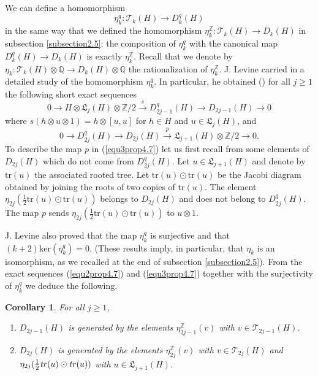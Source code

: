 \documentclass[10pt]{amsart}
\numberwithin{equation}{section}
\numberwithin{equation}{section}
\newtheorem{corollary}[theorem]{Corollary}
\theoremstyle{definition}
\begin{document}
We can define a homomorphism
\begin{equation}\label{equ1prop4.7}
\eta^q_k:\mathcal{T}_k(H)\longrightarrow D_k^q(H) 
\end{equation}
in the same way that we defined the homomorphism $\eta^{\mathbb{Z}}_k:\mathcal{T}_k(H)\rightarrow D_k(H)$ in subsection \ref{subsection2.5}:  the composition of $\eta^q_k$ with the canonical map $D^q_k(H)\rightarrow D_k(H)$ is exactly $\eta^{\mathbb{Z}}_k$. Recall that we denote by $\eta_k:\mathcal{T}_k(H)\otimes\mathbb{Q}\rightarrow D_k(H)\otimes\mathbb{Q}$ the rationalization of $\eta^{\mathbb{Z}}_k$.  J. Levine carried in \cite{MR2240921} a detailed study of the homomorphism $\eta^q_k$. In particular, he obtained (\cite[Corollary 2.3]{MR2240921}) for  all $j\geq 1$ the following short exact sequences
\begin{equation}\label{equ2prop4.7}
0\longrightarrow H\otimes\mathfrak{L}_j(H)\otimes \mathbb{Z}/2\stackrel{s}{\longrightarrow} D^q_{2j-1}(H)\longrightarrow D_{2j-1}(H)\longrightarrow 0
\end{equation}
where $s(h\otimes u\otimes 1)=h\otimes [u,u]$ for $h\in H$ and $u\in \mathfrak{L}_j(H)$, and
\begin{equation}\label{equ3prop4.7}
0\longrightarrow D^q_{2j}(H)\longrightarrow D_{2j}(H)\stackrel{p}{\longrightarrow}\mathfrak{L}_{j+1}(H)\otimes\mathbb{Z}/2\longrightarrow 0.
\end{equation}
To describe the map $p$ in (\ref{equ3prop4.7}) let us first recall from \cite[Remark 2.4]{MR2240921} some elements of $D_{2j}(H)$ which do not come from $D^q_{2j}(H)$. Let $u\in\mathfrak{L}_{j+1}(H)$ and denote by $\text{tr}(u)$ the associated rooted tree. Let $\text{tr}(u)\odot\text{tr}(u)$ be the  Jacobi diagram obtained by joining the roots of two copies of $\text{tr}(u)$. The element $\eta_{2j}(\frac{1}{2}\text{tr}(u)\odot\text{tr}(u))$ belongs to $D_{2j}(H)$ and does not belong to $D^{q}_{2j}(H)$. The map $p$ sends $\eta_{2j}(\frac{1}{2}\text{tr}(u)\odot\text{tr}(u))$  to $u\otimes 1$.


J. Levine also  proved  \cite[Theorem 1]{MR1943338} that the map $\eta^q_k$ is surjective and that $(k+2)\text{ker}(\eta^q_k)=0$. (These results imply, in particular, that $\eta_k$ is an isomorphism, as we recalled at the end of subsection \ref{subsection2.5}). From  the exact sequences (\ref{equ2prop4.7}) and (\ref{equ3prop4.7}) together with the surjectivity of $\eta^q_k$ we deduce the following.

\begin{corollary}\label{corollary1prop4.7} For all $j\geq 1$, 
\begin{enumerate}
\item[\emph{(\emph{i})}] $D_{2j-1}(H)$ is generated by the elements $\eta^{\mathbb{Z}}_{2j-1}(v)$ with $v\in \mathcal{T}_{2j-1}(H)$.
\item[\emph{(\emph{ii})}] $D_{2j}(H)$ is generated by the elements $\eta^{\mathbb{Z}}_{2j}(v)$ with $v\in \mathcal{T}_{2j}(H)$ and
$\eta_{2j}(\frac{1}{2}\text{\emph{tr}}(u)\odot\text{\emph{tr}}(u))$ with $u\in\mathfrak{L}_{j+1}(H)$.
\end{enumerate}
\end{corollary}
\end{document}
